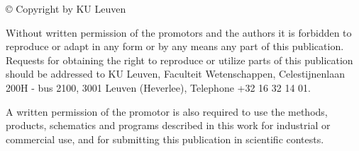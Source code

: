 \vspace*{\fill}
© Copyright by KU Leuven

Without written permission of the promotors and the authors it is forbidden to reproduce or adapt in any form or by any means any part of this publication. Requests for obtaining the right to reproduce or utilize parts of this publication should be addressed to KU Leuven, Faculteit Wetenschappen, Celestijnenlaan 200H - bus 2100, 3001 Leuven (Heverlee), Telephone +32 16 32 14 01.

A written permission of the promotor is also required to use the methods, products, schematics and programs described in this work for industrial or commercial use, and for submitting this publication in scientific contests.
